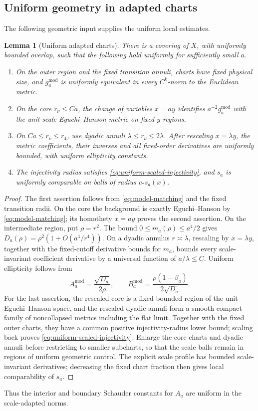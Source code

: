 \documentclass[11pt,a4paper,twoside]{article}
\numberwithin{equation}{section}
\newtheorem{lemma}[theorem]{Lemma}
\theoremstyle{definition}
\theoremstyle{remark}
\begin{document}
\subsection{Uniform geometry in adapted charts}
\label{subsec:uniform-adapted-geometry}

The following geometric input supplies the uniform local estimates.

\begin{lemma}[Uniform adapted charts]
\label{lem:uniform-adapted-charts-final}
There is a covering of \(X\), with uniformly bounded overlap, such
that the following hold uniformly for sufficiently small \(a\).
\begin{enumerate}
\item
On the outer region and the fixed transition annuli, charts have
fixed physical size, and \(g_a^{\mathrm{mod}}\) is uniformly
equivalent in every \(C^k\)-norm to the Euclidean metric.
\item
On the core \(r_\nu\le Ca\), the change of variables \(x=ay\)
identifies \(a^{-2}g_a^{\mathrm{mod}}\) with the unit-scale
Eguchi--Hanson metric on fixed \(y\)-regions.
\item
On \(Ca\le r_\nu\le r_4\), use dyadic annuli
\(\lambda\le r_\nu\le2\lambda\). After rescaling
\(x=\lambda y\), the metric coefficients, their inverses and all
fixed-order derivatives are uniformly bounded, with uniform
ellipticity constants.
\item
The injectivity radius satisfies \eqref{eq:uniform-scaled-injectivity},
and \(s_a\) is uniformly comparable on balls of radius
\(c_*s_a(x)\).
\end{enumerate}
\end{lemma}
\begin{proof}
The first assertion follows from \eqref{eq:model-matching} and the fixed
transition radii. On the core the background is exactly
Eguchi--Hanson by \eqref{eq:model-matching}; its homothety \(x=ay\)
proves the second assertion. On the intermediate region, put
\(\rho=r^2\). The bound \(0\le m_a(\rho)\le a^4/2\) gives
\(D_a(\rho)=\rho^2(1+O(a^4/r^4))\). On a dyadic annulus
\(r\asymp\lambda\), rescaling by \(x=\lambda y\), together with the fixed-cutoff derivative bounds for \(m_a\),
bounds every scale-invariant coefficient derivative by a universal
function of \(a/\lambda\le C\). Uniform ellipticity follows from
\[
A_a^{\mathrm{mod}}=\frac{\sqrt{D_a}}{2\rho},
\qquad
B_a^{\mathrm{mod}}=\frac{\rho(1-\beta_a)}{2\sqrt{D_a}}.
\]
For the last assertion, the rescaled core is a fixed bounded region
of the unit Eguchi--Hanson space, and the rescaled dyadic annuli
form a smooth compact family of noncollapsed metrics including the
flat limit. Together with the fixed outer charts, they have a common
positive injectivity-radius lower bound; scaling back proves
\eqref{eq:uniform-scaled-injectivity}. Enlarge the core charts and
dyadic annuli before restricting to smaller subcharts, so that the
scale balls remain in regions of uniform geometric control. The
explicit scale profile has bounded scale-invariant derivatives;
decreasing the fixed chart fraction then gives local comparability
of \(s_a\).
\end{proof}
Thus the interior and boundary Schauder constants for \(A_a\) are
uniform in the scale-adapted norms.
\end{document}
